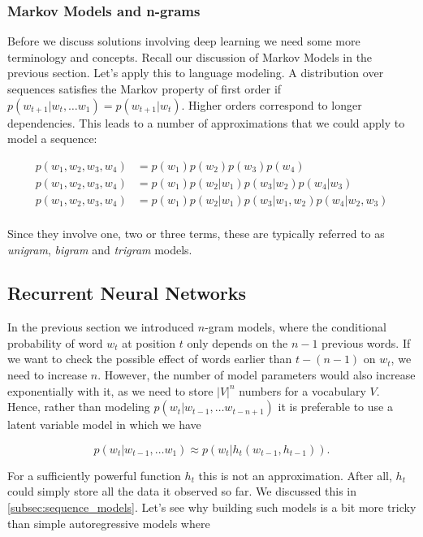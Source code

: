 \subsubsection{Markov Models and n-grams}

Before we discuss solutions involving deep learning we need some more terminology and concepts. Recall our discussion of Markov Models in the previous section. Let’s apply this to language modeling. A distribution over sequences satisfies the Markov property of first order if $p(w_{t+1}|w_t, \ldots w_1) = p(w_{t+1}|w_t)$. Higher orders correspond to longer dependencies. This leads to a number of approximations that we could apply to model a sequence:

$$
\begin{aligned}
p(w_1, w_2, w_3, w_4) &=  p(w_1) p(w_2) p(w_3) p(w_4)\\
p(w_1, w_2, w_3, w_4) &=  p(w_1) p(w_2 | w_1) p(w_3 | w_2) p(w_4 | w_3)\\
p(w_1, w_2, w_3, w_4) &=  p(w_1) p(w_2 | w_1) p(w_3 | w_1, w_2) p(w_4 | w_2, w_3)\\
\end{aligned}
$$

Since they involve one, two or three terms, these are typically referred to as \textit{unigram}, \textit{bigram} and \textit{trigram} models. 

\subsection{Recurrent Neural Networks}\label{subsec:rnn}

In the previous section we introduced $n$-gram models, where the conditional probability of word $w_t$ at position $t$ only depends on the $n-1$ previous words. If we want to check the possible effect of words earlier than $t-(n-1)$ on $w_t$, we need to increase $n$. However, the number of model parameters would also increase exponentially with it, as we need to store $|V|^n$ numbers for a vocabulary $V$. Hence, rather than modeling $p(w_t|w_{t-1}, \ldots w_{t-n+1})$ it is preferable to use a latent variable model in which we have

$$p(w_t|w_{t-1}, \ldots w_1) \approx p(w_t|h_t(w_{t-1}, h_{t-1})).$$

For a sufficiently powerful function $h_t$ this is not an approximation. After
all, $h_t$ could simply store all the data it observed so far. We discussed this
in \cref{subsec:sequence_models}. Let's see why building such models is a bit more tricky than simple autoregressive models where

